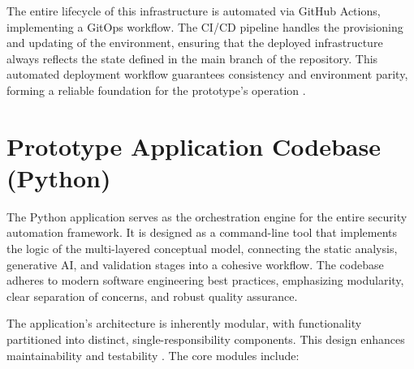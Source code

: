 The entire lifecycle of this infrastructure is automated via GitHub Actions, implementing a GitOps workflow. The CI/CD pipeline handles the provisioning and updating of the environment, ensuring that the deployed infrastructure always reflects the state defined in the main branch of the repository. This automated deployment workflow guarantees consistency and environment parity, forming a reliable foundation for the prototype's operation \cite{wego_gitops_2018}.


\section{Prototype Application Codebase (Python)}

The Python application serves as the orchestration engine for the entire security automation framework. It is designed as a command-line tool that implements the logic of the multi-layered conceptual model, connecting the static analysis, generative AI, and validation stages into a cohesive workflow. The codebase adheres to modern software engineering best practices, emphasizing modularity, clear separation of concerns, and robust quality assurance.

The application's architecture is inherently modular, with functionality partitioned into distinct, single-responsibility components. This design enhances maintainability and testability \cite{martin_clean_2008}. The core modules include:

